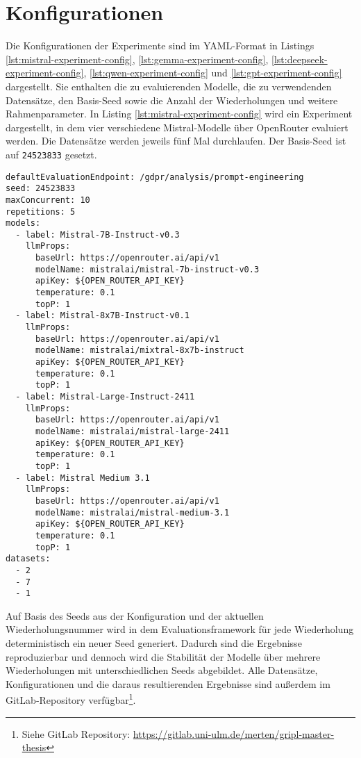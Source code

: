 \section{Konfigurationen}\label{sec:konfigurationen}

Die Konfigurationen der Experimente sind im YAML-Format in Listings \ref{lst:mistral-experiment-config}, \ref{lst:gemma-experiment-config}, \ref{lst:deepseek-experiment-config}, \ref{lst:qwen-experiment-config} und \ref{lst:gpt-experiment-config} dargestellt. Sie enthalten die zu evaluierenden Modelle, die zu verwendenden Datensätze, den Basis-Seed sowie die Anzahl der Wiederholungen und weitere Rahmenparameter. In Listing \ref{lst:mistral-experiment-config} wird ein Experiment dargestellt, in dem vier verschiedene Mistral-Modelle über OpenRouter evaluiert werden. Die Datensätze werden jeweils fünf Mal durchlaufen. Der Basis-Seed ist auf \texttt{24523833} gesetzt.

\begin{lstlisting}[float, caption={Konfigurationsdatei des Experiments mit Mistral Modellen}, label={lst:mistral-experiment-config}]
defaultEvaluationEndpoint: /gdpr/analysis/prompt-engineering
seed: 24523833
maxConcurrent: 10
repetitions: 5
models:
  - label: Mistral-7B-Instruct-v0.3
    llmProps:
      baseUrl: https://openrouter.ai/api/v1
      modelName: mistralai/mistral-7b-instruct-v0.3
      apiKey: ${OPEN_ROUTER_API_KEY}
      temperature: 0.1
      topP: 1
  - label: Mistral-8x7B-Instruct-v0.1
    llmProps:
      baseUrl: https://openrouter.ai/api/v1
      modelName: mistralai/mixtral-8x7b-instruct
      apiKey: ${OPEN_ROUTER_API_KEY}
      temperature: 0.1
      topP: 1
  - label: Mistral-Large-Instruct-2411
    llmProps:
      baseUrl: https://openrouter.ai/api/v1
      modelName: mistralai/mistral-large-2411
      apiKey: ${OPEN_ROUTER_API_KEY}
      temperature: 0.1
      topP: 1
  - label: Mistral Medium 3.1
    llmProps:
      baseUrl: https://openrouter.ai/api/v1
      modelName: mistralai/mistral-medium-3.1
      apiKey: ${OPEN_ROUTER_API_KEY}
      temperature: 0.1
      topP: 1
datasets:
  - 2
  - 7
  - 1
\end{lstlisting}

Auf Basis des Seeds aus der Konfiguration und der aktuellen Wiederholungsnummer wird in dem Evaluationsframework für jede Wiederholung deterministisch ein neuer Seed generiert. Dadurch sind die Ergebnisse reproduzierbar und dennoch wird die Stabilität der Modelle über mehrere Wiederholungen mit unterschiedlichen Seeds abgebildet. Alle Datensätze, Konfigurationen und die daraus resultierenden Ergebnisse sind außerdem im GitLab‑Repository verfügbar\footnote{Siehe GitLab Repository: \url{https://gitlab.uni-ulm.de/merten/gripl-master-thesis}}.

